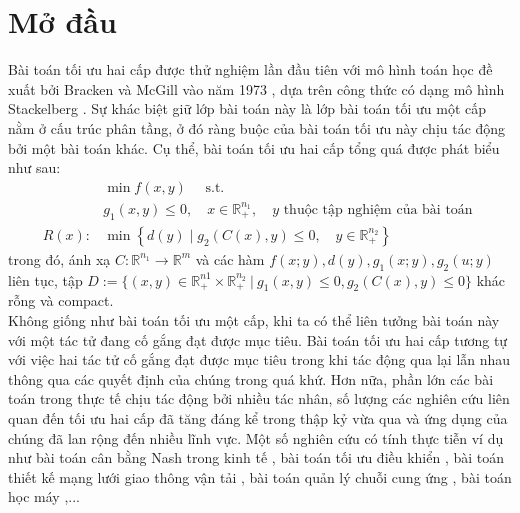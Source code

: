 \documentclass[oneside, a4paper]{book}
\newcommand{\R}{\mathbb{R}}
\theoremstyle{plain}
\theoremstyle{definition}
\theoremstyle{remark}
\renewcommand{\large}{\fontsize{14pt}{14pt}\selectfont}
\begin{document}


\chapter*{Mở đầu}
\large
{}
Bài toán tối ưu hai cấp được thử nghiệm lần đầu tiên với mô hình toán học đề xuất bởi Bracken và McGill vào năm 1973 \cite{Bracken1973}, dựa trên công thức có dạng mô hình Stackelberg \cite{Stackelberg1934}. Sự khác biệt giữ lớp bài toán này là lớp bài toán tối ưu một cấp nằm ở cấu trúc phân tầng, ở đó ràng buộc của bài toán tối ưu này chịu tác động bởi một bài toán khác. Cụ thể, bài toán tối ưu hai cấp tổng quá được phát biểu như sau:
\begin{equation} \tag*{(GBP)}\label{GBP}
    \begin{aligned}
        & \min f(x, y) \quad \text { s.t. } \\
        & g_1(x, y) \leq 0, \quad x \in \mathbb{R}_{+}^{n_1}, \quad y \text { thuộc tập nghiệm của bài toán } \\
        R(x): & \min \left\{d(y) \mid g_2(C(x), y) \leq 0, \quad y \in \mathbb{R}_{+}^{n_2}\right\}
\end{aligned}
\end{equation}
trong đó, ánh xạ $C: \R^{n_1} \to \R^m$ và các hàm $f(x; y), d(y), g_1(x; y), g_2(u; y)$ liên tục, tập $D:= \{(x, y) \in \R^{n1}_+ \times \R^{n_2}_+\ |\ g_1(x, y) \leq 0, g_2(C(x), y) \leq 0  \}$ khác rỗng và compact.\\
\indent Không giống như bài toán tối ưu một cấp, khi ta có thể liên tưởng bài toán này với một tác tử đang cố gắng đạt được mục tiêu. Bài toán tối ưu hai cấp tương tự với việc hai tác tử cố gắng đạt được mục tiêu trong khi tác động qua lại lẫn nhau thông qua các quyết định của chúng trong quá khứ. Hơn nữa, phần lớn các bài toán trong thực tế chịu tác động bởi nhiều tác nhân, số lượng các nghiên cứu liên quan đến tối ưu hai cấp đã tăng đáng kể trong thập kỷ vừa qua và ứng dụng của chúng đã lan rộng đến nhiều lĩnh vực. Một số nghiên cứu có tính thực tiễn ví dụ như bài toán cân bằng Nash trong kinh tế \cite{Nash1950}, bài toán tối ưu điều khiển \cite{Kalashnikov2018}, bài toán thiết kế mạng lưới giao thông vận tải \cite{Ukkusuri2013,Angulo2014}, bài toán quản lý chuỗi cung ứng \cite{Gao2011,Lukac2008}, bài toán học máy \cite{Franceschi2018,MacKay2019},... \\
\end{document}
